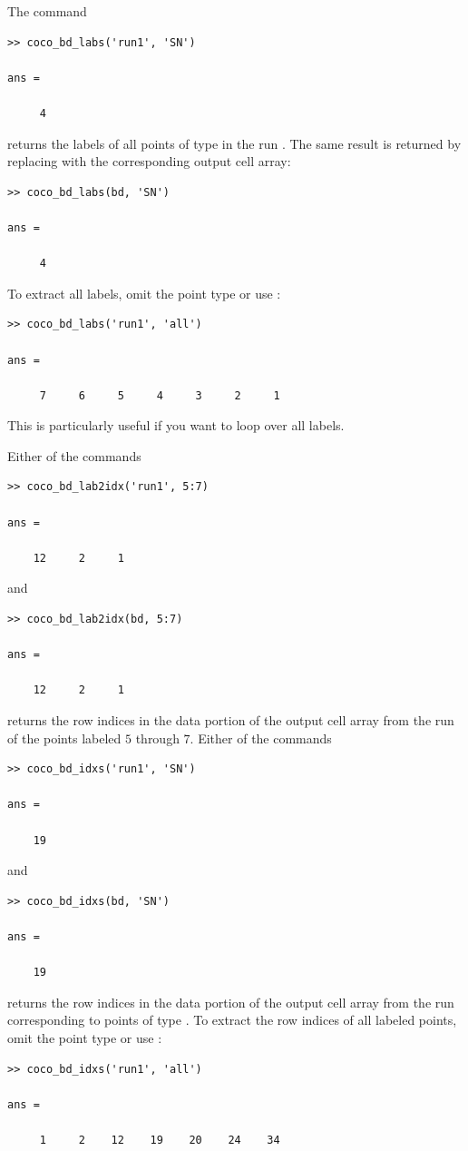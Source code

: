 The command
\begin{lstlisting}[language=coco-highlight,frame=lines]
>> coco_bd_labs('run1', 'SN')

ans =

     4
\end{lstlisting}
returns the labels of all points of type  in the run . The same result is returned by replacing  with the corresponding  output cell array:
\begin{lstlisting}[language=coco-highlight,frame=lines]
>> coco_bd_labs(bd, 'SN')

ans =

     4
\end{lstlisting}
To extract all labels, omit the point type or use :
\begin{lstlisting}[language=coco-highlight,frame=lines]
>> coco_bd_labs('run1', 'all')

ans =

     7     6     5     4     3     2     1
\end{lstlisting}
This is particularly useful if you want to loop over all labels.

Either of the commands
\begin{lstlisting}[language=coco-highlight,frame=lines]
>> coco_bd_lab2idx('run1', 5:7)

ans =

    12     2     1
\end{lstlisting}
and
\begin{lstlisting}[language=coco-highlight,frame=lines]
>> coco_bd_lab2idx(bd, 5:7)

ans =

    12     2     1
\end{lstlisting}
returns the row indices in the data portion of the output cell array from the run  of the points labeled $5$ through $7$. Either of the commands
\begin{lstlisting}[language=coco-highlight,frame=lines]
>> coco_bd_idxs('run1', 'SN')

ans =

    19
\end{lstlisting}
and
\begin{lstlisting}[language=coco-highlight,frame=lines]
>> coco_bd_idxs(bd, 'SN')

ans =

    19
\end{lstlisting}
returns the row indices in the data portion of the output cell array from the run  corresponding to points of type . To extract the row indices of all labeled points, omit the point type or use :
\begin{lstlisting}[language=coco-highlight,frame=lines]
>> coco_bd_idxs('run1', 'all')

ans =

     1     2    12    19    20    24    34
\end{lstlisting}

